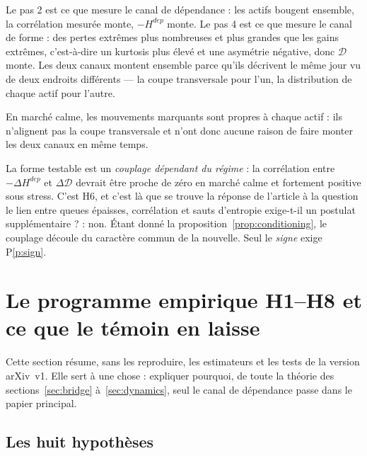 \documentclass[11pt]{article}
\theoremstyle{definition}
\theoremstyle{remark}
\newcommand{\DD}{\mathcal{D}}
\begin{document}
Le pas 2 est ce que mesure le canal de dépendance : les actifs bougent ensemble,
la corrélation mesurée monte, $-H^{dep}$ monte. Le pas 4 est ce que mesure le
canal de forme : des pertes extrêmes plus nombreuses et plus grandes que les
gains extrêmes, c'est-à-dire un kurtosis plus élevé et une asymétrie négative,
donc $\DD$ monte. Les deux canaux montent ensemble parce qu'ils décrivent le
même jour vu de deux endroits différents --- la coupe transversale pour l'un, la
distribution de chaque actif pour l'autre.

En marché calme, les mouvements marquants sont propres à chaque actif : ils
n'alignent pas la coupe transversale et n'ont donc aucune raison de faire monter
les deux canaux en même temps.

La forme testable est un \emph{couplage dépendant du régime} : la corrélation
entre $-\Delta H^{dep}$ et $\Delta\DD$ devrait être proche de zéro en marché
calme et fortement positive sous stress. C'est H6, et c'est là que se trouve la
réponse de l'article à la question \og le lien entre queues épaisses, corrélation
et sauts d'entropie exige-t-il un postulat supplémentaire ? \fg{} : non. Étant
donné la proposition~\ref{prop:conditioning}, le couplage découle du caractère
commun de la nouvelle. Seul le \emph{signe} exige P\ref{p:sign}.


\section{Le programme empirique H1--H8 et ce que le témoin en laisse}
\label{sec:program}

Cette section résume, sans les reproduire, les estimateurs et les tests de la
version arXiv~v1. Elle sert à une chose : expliquer pourquoi, de toute la
théorie des sections~\ref{sec:bridge} à~\ref{sec:dynamics}, seul le canal de
dépendance passe dans le papier principal.

\subsection{Les huit hypothèses}
\end{document}
